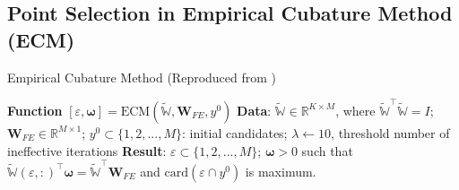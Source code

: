 \documentclass[11pt]{article}
\renewcommand{\vec}[1]{\mathbf{#1}}
\begin{document}
\subsection{Point Selection in Empirical Cubature Method (ECM)}
\begin{algorithm}[H]
\caption{Empirical Cubature Method (Reproduced from \cite{bravo2024subspace})}
\label{alg:ECM_PS}
\begin{algorithmic}[1]
\STATE \textbf{Function} $[ \varepsilon, \boldsymbol\omega] = \text{ECM}(\widetilde{\mathbb{W}}, \vec{W}_{FE}, y^0)$
\STATE \textbf{Data}: $\widetilde{\mathbb{W}} \in \mathbb{R}^{K \times M}$, where $\widetilde{\mathbb{W}}^\top \widetilde{\mathbb{W}} = I$; $\vec{W}_{FE} \in \mathbb{R}^{M\times 1}$; $y^0 \subset \{1, 2, ..., M\}$: initial candidates; $\lambda \leftarrow 10$, threshold number of ineffective iterations
\STATE \textbf{Result}: $\varepsilon \subset \{1, 2, ..., M\}$; $\boldsymbol\omega > 0$ such that $ \widetilde{\mathbb{W}}(\varepsilon, :)^\top \boldsymbol\omega = \widetilde{\mathbb{W}}^\top \vec{W}_{FE}$ and $\text{card}(\varepsilon \cap y^0)$ is maximum.
\end{algorithmic}
\end{algorithm}
\end{document}
